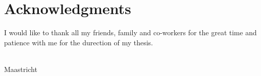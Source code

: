 \chapter{Acknowledgments}
I would like to thank all my friends, family and co-workers for the great time and patience with me for the durection of my thesis.

{\flushright \thesisauthor \\ Maastricht \\ \thesisdate \\ }